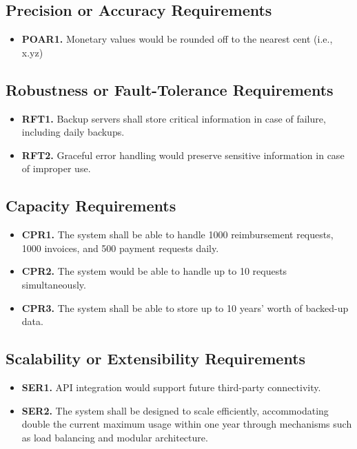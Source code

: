 \documentclass[12pt]{article}
\begin{document}
\subsection{Precision or Accuracy Requirements}

\label{POAR}

\begin{itemize}
    \item \textbf{POAR1.} Monetary values would be rounded off to the nearest cent (i.e., x.yz)
\end{itemize}

\subsection{Robustness or Fault-Tolerance Requirements}

\label{RFT}

\begin{itemize}
    \item \textbf{RFT1.} Backup servers shall store critical information in case of failure, including daily backups.
    \item \textbf{RFT2.} Graceful error handling would preserve sensitive information in case of improper use.
\end{itemize}

\subsection{Capacity Requirements}

\label{CPR}

\begin{itemize}
    \item \textbf{CPR1.} The system shall be able to handle 1000 reimbursement requests, 1000 invoices, and 500 payment requests daily.
    \item \textbf{CPR2.} The system would be able to handle up to 10 requests simultaneously.
    \item \textbf{CPR3.} The system shall be able to store up to 10 years’ worth of backed-up data.
\end{itemize}

\subsection{Scalability or Extensibility Requirements}

\label{SER}

\begin{itemize}
    \item \textbf{SER1.} API integration would support future third-party connectivity.
    \item \textbf{SER2.} The system shall be designed to scale efficiently, accommodating double the current maximum usage within one year through mechanisms such as load balancing and modular architecture.
\end{itemize}
\end{document}
